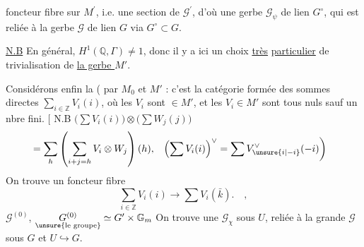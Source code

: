 foncteur fibre sur $M^{\prime}$, i.e. une section de $\mathscr G^{\prime}$,
d'où une  gerbe
$\mathscr G_{\psi}$ de lien $G^\circ$, qui  est 
reliée à la gerbe $\mathscr G$ de lien $G$ via $G^\circ\subset G$.

\uline{N.B} En général, $H^1(\mathbb Q,\Gamma)\ne 1$, donc il y a
ici un choix \uline{très} \uline{particulier} de trivialisation de
\uline{la gerbe $M'$}.

Considérons enfin la 
( par $M_0$ et $M'$ : c'est la catégorie formée des
sommes directes $\displaystyle\sum_{i\in\mathbb Z}V_i(i)$, où les
$V_i$ sont $\in M'$, et les $V_i\in M'$ sont tous
nuls sauf un nbre fini. $\big[$ N.B $\big(\sum V_i(i)\big)\otimes\big(\sum W_j(j)\big)$
\[
\begin{aligned}
 &=\sum_h\left(\sum_{i+j=h} V_i\otimes W_j\right)(h),&
 \left(\sum V_i(i)\right)^\vee&=\sum V_{\unsure{i|-i}}^\vee(-i)\bigg)
\end{aligned}
\]
On trouve un foncteur fibre
\[
 \sum_{i\in\mathbb Z}V_i(i)\longrightarrow\sum V_i(\bar k).\quad,
\]
 $\mathscr G^{(0)}$, $\underset{\text{\unsure{le groupe}}}{G^{(0)}}\simeq G'\times\mathbb G_m$
On trouve une  $\mathscr G_{\chi}$ sous $U$,
reliée à la grande $\mathscr G$ sous $G$  et $U\hookrightarrow G$.
